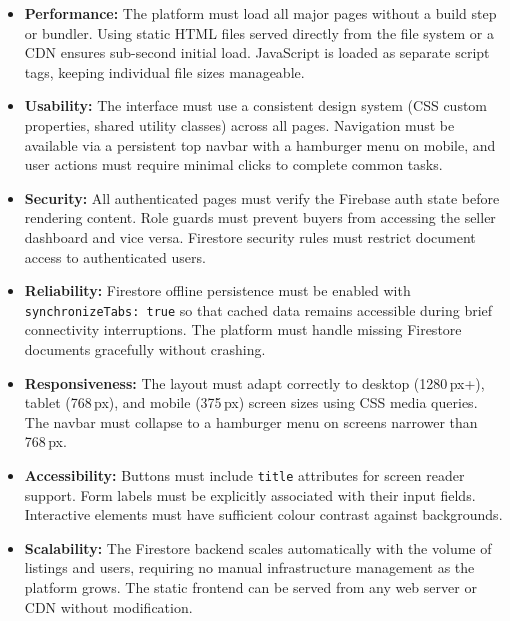 \documentclass[12pt,a4paper]{report}
\begin{document}
\begin{itemize}[leftmargin=2.5em]
  \item \textbf{Performance:}
    The platform must load all major pages without a build step or bundler.
    Using static HTML files served directly from the file system or a CDN ensures
    sub-second initial load. JavaScript is loaded as separate script tags, keeping
    individual file sizes manageable.

  \item \textbf{Usability:}
    The interface must use a consistent design system (CSS custom properties,
    shared utility classes) across all pages. Navigation must be available via a
    persistent top navbar with a hamburger menu on mobile, and user actions must
    require minimal clicks to complete common tasks.

  \item \textbf{Security:}
    All authenticated pages must verify the Firebase auth state before rendering
    content. Role guards must prevent buyers from accessing the seller dashboard
    and vice versa. Firestore security rules must restrict document access to
    authenticated users.

  \item \textbf{Reliability:}
    Firestore offline persistence must be enabled with \texttt{synchronizeTabs:
    true} so that cached data remains accessible during brief connectivity
    interruptions. The platform must handle missing Firestore documents
    gracefully without crashing.

  \item \textbf{Responsiveness:}
    The layout must adapt correctly to desktop (1280\,px+), tablet (768\,px),
    and mobile (375\,px) screen sizes using CSS media queries. The navbar must
    collapse to a hamburger menu on screens narrower than 768\,px.

  \item \textbf{Accessibility:}
    Buttons must include \texttt{title} attributes for screen reader support.
    Form labels must be explicitly associated with their input fields.
    Interactive elements must have sufficient colour contrast against backgrounds.

  \item \textbf{Scalability:}
    The Firestore backend scales automatically with the volume of listings and
    users, requiring no manual infrastructure management as the platform grows.
    The static frontend can be served from any web server or CDN without
    modification.
\end{itemize}
\end{document}
